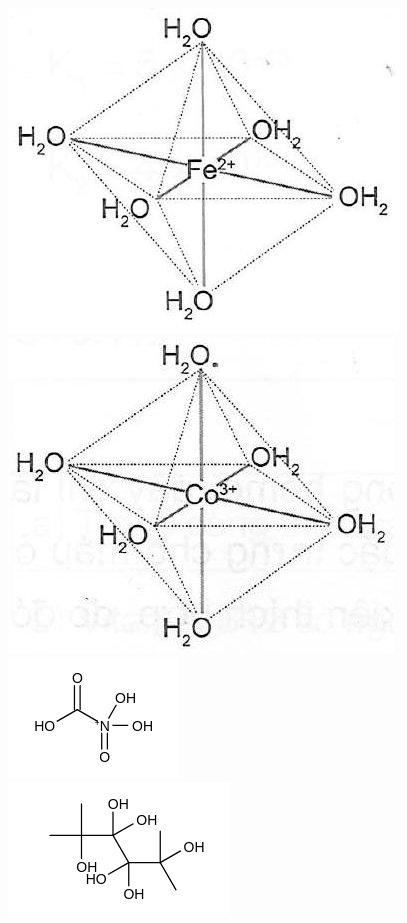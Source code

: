 \documentclass[10pt]{article}
\begin{document}
\includegraphics[max width=\textwidth, center]{2025_10_23_b4e16b74380d0f7e7700g-121}\\
\includegraphics[max width=\textwidth, center]{2025_10_23_b4e16b74380d0f7e7700g-122}\\
\includegraphics{smile-3feccab6e2b51cca210de82ee97d453c9f138625}\\
\includegraphics{smile-a5b7c67c4dea4e52406bedc92f422de725a2916a}
\end{document}
